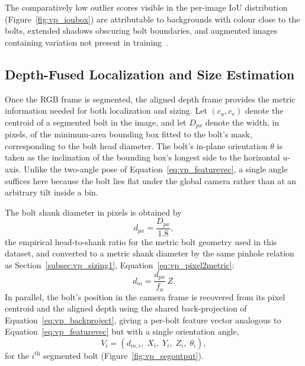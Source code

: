 The comparatively low outlier scores visible in the per-image IoU distribution
(Figure~\ref{fig:vp_ioubox}) are attributable to backgrounds with colour close to the bolts,
extended shadows obscuring bolt boundaries, and augmented images containing variation not present
in training~\citep{sk2024boltsorting}.

\subsection{Depth-Fused Localization and Size Estimation}\label{subsec:vp_sizing2}

Once the RGB frame is segmented, the aligned depth frame provides the metric information needed
for both localization and sizing. Let $(c_u, c_v)$ denote the centroid of a segmented bolt in the
image, and let $D_{px}$ denote the width, in pixels, of the minimum-area bounding box fitted to the
bolt's mask, corresponding to the bolt head diameter. The bolt's
in-plane orientation $\theta$ is taken as the inclination of the bounding box's longest side to the
horizontal $u$-axis. Unlike the two-angle pose of Equation~\eqref{eq:vp_featurevec}, a single angle
suffices here because the bolt lies flat under the global camera rather than at an arbitrary tilt
inside a bin.


The bolt shank diameter in pixels is obtained by
\begin{equation}
d_{px} = \frac{D_{px}}{1.8},
\label{eq:vp_shankpx}
\end{equation}
the empirical head-to-shank ratio for the metric bolt geometry used in this dataset, and converted
to a metric shank diameter by the same pinhole relation as Section~\ref{subsec:vp_sizing1},
Equation~\eqref{eq:vp_pixel2metric}:
\begin{equation}
d_m = \frac{d_{px}}{f_u}\,Z.
\label{eq:vp_shankm}
\end{equation}
In parallel, the bolt's position in the camera frame is recovered from its pixel centroid and the
aligned depth using the shared back-projection of Equation~\eqref{eq:vp_backproject}, giving a
per-bolt feature vector analogous to Equation~\eqref{eq:vp_featurevec} but with a single orientation
angle,
\begin{equation}
V_i = \left( d_{m,i},\; X_i,\; Y_i,\; Z_i,\; \theta_i \right),
\label{eq:vp_featurevec2}
\end{equation}
for the $i^{\text{th}}$ segmented bolt (Figure~\ref{fig:vp_segoutput}).


